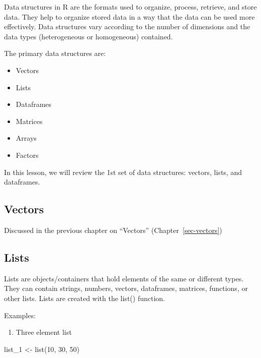 \documentclass[
  letterpaper,
  DIV=11,
  numbers=noendperiod]{scrreprt}
\newenvironment{Shaded}{\begin{snugshade}}{\end{snugshade}}
\newcommand{\DecValTok}[1]{\textcolor[rgb]{0.68,0.00,0.00}{#1}}
\newcommand{\FunctionTok}[1]{\textcolor[rgb]{0.28,0.35,0.67}{#1}}
\newcommand{\NormalTok}[1]{\textcolor[rgb]{0.00,0.23,0.31}{#1}}
\newcommand{\OtherTok}[1]{\textcolor[rgb]{0.00,0.23,0.31}{#1}}
\providecommand{\tightlist}{%
  \setlength{\itemsep}{0pt}\setlength{\parskip}{0pt}}\usepackage{longtable,booktabs,array}
\begin{document}
Data structures in R are the formats used to organize, process,
retrieve, and store data. They help to organize stored data in a way
that the data can be used more effectively. Data structures vary
according to the number of dimensions and the data types (heterogeneous
or homogeneous) contained.

The primary data structures are:

\begin{itemize}
\tightlist
\item
  Vectors
\item
  Lists
\item
  Dataframes
\item
  Matrices
\item
  Arrays
\item
  Factors
\end{itemize}

In this lesson, we will review the 1st set of data structures: vectors,
lists, and dataframes.

\subsection{Vectors}\label{vectors}

Discussed in the previous chapter on ``Vectors''
(Chapter~\ref{sec-vectors})

\subsection{Lists}\label{lists}

Lists are objects/containers that hold elements of the same or different
types. They can contain strings, numbers, vectors, dataframes, matrices,
functions, or other lists. Lists are created with the list() function.

Examples:

\begin{enumerate}
\def\labelenumi{\alph{enumi}.}
\tightlist
\item
  Three element list
\end{enumerate}

\begin{Shaded}
\begin{Highlighting}[]
\NormalTok{list\_1 }\OtherTok{\textless{}{-}} \FunctionTok{list}\NormalTok{(}\DecValTok{10}\NormalTok{, }\DecValTok{30}\NormalTok{, }\DecValTok{50}\NormalTok{)}
\end{Highlighting}
\end{Shaded}
\end{document}
